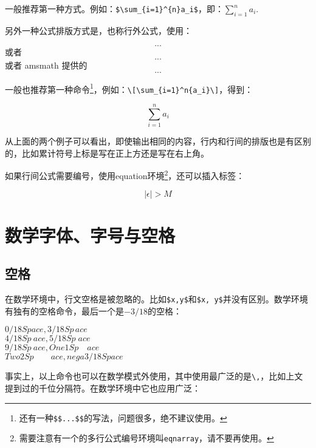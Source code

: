 {一般推荐第一种方式。例如：\verb|$\sum_{i=1}^{n}a_i$|，即：$\sum_{i=1}^{n}a_i$. 

另外一种公式排版方式是，也称行外公式，使用：
\begin{latex}{}
\[...\] 或者 \begin{displaymath}...\end{displaymath}
或者 amsmath 提供的\begin{equation*}...\end{equation*}
\end{latex}

一般也推荐第一种命令\footnote{还有一种\texttt{\$\$...\$\$}的写法，问题很多，绝不建议使用。}，例如：\verb|\[\sum_{i=1}^n{a_i}\]|，得到：

\[\sum_{i=1}^{n}a_i\]

从上面的两个例子可以看出，即使输出相同的内容，行内和行间的排版也是有区别的，比如累计符号上标是写在正上方还是写在右上角。

如果行间公式需要编号，使用equation环境\footnote{需要注意有一个的多行公式编号环境叫\texttt{eqnarray}，请不要再使用。}，还可以插入标签：

\begin{codeshow}
\begin{equation}
\label{eq:NoExample}
  |\epsilon|>M
\end{equation}
\end{codeshow}

\section{数学字体、字号与空格}
\label{sec:mathfont}
\subsection{空格}
在数学环境中，行文空格是被忽略的。比如\verb|$x,y$|和\verb|$x, y$|并没有区别。数学环境有独有的空格命令，最后一个是$-3/18$的空格：

\begin{codeshow}
  $0/18Space,3/18Sp\,ace$ \\
  $4/18Sp\:ace,5/18Sp\;ace$ \\
  $9/18Sp\ ace,One1Sp\quad ace$ \\
  $Two2Sp\qquad ace,nega3/18Sp\!ace$
\end{codeshow}

事实上，以上命令也可以在数学模式外使用，其中使用最广泛的是\verb|\,|，比如上文提到过的千位分隔符。在数学环境中它也应用广泛：

}
